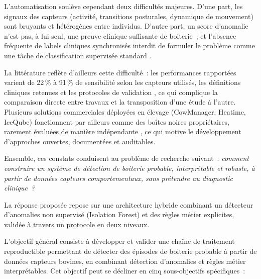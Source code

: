 \begin{introduction}
L'automatisation soulève cependant deux difficultés majeures. D'une part, les signaux
des capteurs (activité, transitions posturales, dynamique de mouvement) sont bruyants et
hétérogènes entre individus. D'autre part, un score d'anomalie n'est pas, à lui seul, une
preuve clinique suffisante de boiterie~; et l'absence fréquente de labels cliniques
synchronisés interdit de formuler le problème comme une tâche de classification supervisée
standard \citep{alsaaod2019automatic,oleary2020accelerometers}.

La littérature reflète d'ailleurs cette difficulté~: les performances rapportées varient
de 22\,\% à 91\,\% de sensibilité selon les capteurs utilisés, les définitions cliniques
retenues et les protocoles de validation
\citep{oleary2020accelerometers,gonzalezgarcia2023systematic}, ce qui complique la
comparaison directe entre travaux et la transposition d'une étude à l'autre. Plusieurs
solutions commerciales déployées en élevage (CowManager, Heatime, IceQube) fonctionnent
par ailleurs comme des boîtes noires propriétaires, rarement évaluées de manière
indépendante \citep{rutten2013invited}, ce qui motive le développement d'approches
ouvertes, documentées et auditables.

Ensemble, ces constats conduisent au problème de recherche suivant~: \textit{comment construire un
système de détection de boiterie probable, interprétable et robuste, à partir de données
capteurs comportementaux, sans prétendre au diagnostic clinique~?}

La réponse proposée repose sur une architecture hybride combinant un détecteur d'anomalies
non supervisé (Isolation Forest) et des règles métier explicites, validée à
travers un protocole en deux niveaux.

L'objectif général consiste à développer et valider une chaîne de traitement reproductible
permettant de détecter des épisodes de boiterie probable à partir de données capteurs
bovines, en combinant détection d'anomalies et règles métier interprétables. Cet objectif
peut se décliner en cinq sous-objectifs spécifiques~:


\end{introduction}
